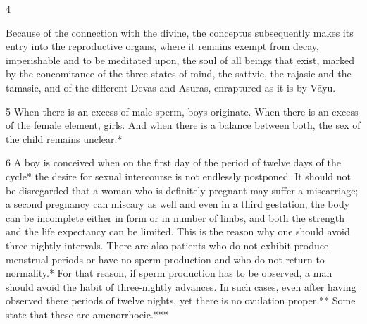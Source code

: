 \begin{translation}
\bigskip

\begin{tt}
    \raggedright


\item[4]



Because of the connection 
with the divine, the conceptus subsequently makes its entry into the reproductive 
organs, where it remains exempt from decay, imperishable and to be meditated 
upon, the soul of all beings that exist, marked by the concomitance of the three 
states-of-mind, the sattvic, the rajasic and the tamasic, and of the different 
Devas and Asuras, enraptured as it is by Vāyu.

\item[5]When there is an excess of male sperm, boys originate. When there is an 
excess of the female element, girls. And when there is a balance between both, 
the sex of the child remains unclear.*

\item[6]A boy is conceived when on the first day of the period of twelve days of 
the cycle* the desire for sexual intercourse is not endlessly postponed. It should 
not be disregarded that a woman who is definitely pregnant may  suffer a 
miscarriage; a second pregnancy can miscary as well and even in a third 
gestation, the body can be incomplete either in form or in number of limbs, and 
both the strength and the life expectancy can be limited. This is the reason why 
one should avoid three-nightly intervals. There are also patients who do not 
exhibit produce menstrual periods or have no sperm production and who do not 
return to normality.* For that reason, if sperm production has to be observed, a 
man should avoid the habit of three-nightly advances. In such cases, even after 
having observed there periods of twelve nights, yet there is no ovulation 
proper.** Some state that these are amenorrhoeic.*** 


\end{tt}
\end{translation}
